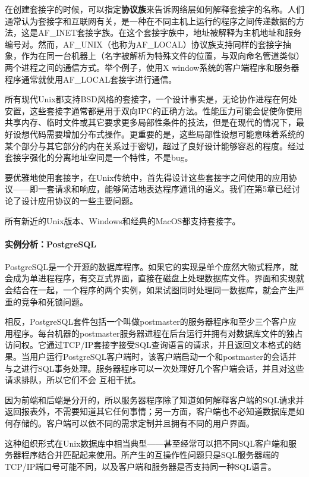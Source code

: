 \documentclass[12pt,oneside]{book}
\begin{document}
\begin{common-format}
在创建套接字的时候，可以指定\textbf{协议族}来告诉网络层如何解释套接字的名称。人们通常认为套接字和互联网有关，是一种在不同主机上运行的程序之间传递数据的方法，这是AF\_{}INET套接字族。在这个套接字族中，地址被解释为主机地址和服务编号对。然而，AF\_{}UNIX（也称为AF\_{}LOCAL）协议族支持同样的套接字抽象，作为在同一台机器上（名字被解析为特殊文件的位置，与双向命名管道类似）两个进程之间的通信方式。举个例子，使用X window系统的客户端程序和服务器程序通常就使用AF\_{}LOCAL套接字进行通信。

所有现代Unix都支持BSD风格的套接字，一个设计事实是，无论协作进程在何处安置，这些套接字通常都是用于双向IPC的正确方法。性能压力可能会促使你使用共享内存、临时文件或其它要求更多局部性条件的技法，但是在现代的情况下，最好设想代码需要增加分布式操作。更重要的是，这些局部性设想可能意味着系统的某个部分与其它部分的内在关系过于密切，超过了良好设计能够容忍的程度。经过套接字强化的分离地址空间是一个特性，不是bug。

要优雅地使用套接字，在Unix传统中，首先得设计这些套接字之间使用的应用协议——即一套请求和响应，能够简洁地表达程序通讯的语义。我们在第5章已经讨论了设计应用协议的一些主要问题。

所有新近的Unix版本、Windows和经典的MacOS都支持套接字。


\paragraph{实例分析：PostgreSQL}
PostgreSQL是一个开源的数据库程序。如果它的实现是单个庞然大物式程序，就会成为单进程程序，有交互式界面，直接在磁盘上处理数据库文件。界面和实现就会结合在一起，一个程序的两个实例，如果试图同时处理同一数据库，就会产生严重的竞争和死锁问题。

相反，PostgreSQL套件包括一个叫做postmaster的服务器程序和至少三个客户应用程序。每台机器的postmaster服务器进程在后台运行并拥有对数据库文件的独占访问权。它通过TCP/IP套接字接受SQL查询语言的请求，并且返回文本格式的结果。当用户运行PostgreSQL客户端时，该客户端启动一个和postmaster的会话并与之进行SQL事务处理。服务器程序可以一次处理好几个客户端会话，并且对这些请求排队，所以它们不会
互相干扰。

因为前端和后端是分开的，所以服务器程序除了知道如何解释客户端的SQL请求并返回报表外，不需要知道其它任何事情；另一方面，客户端也不必知道数据库是如何存储的。客户端可以依不同的需求定制并且拥有不同的用户界面。

这种组织形式在Unix数据库中相当典型——甚至经常可以把不同SQL客户端和服务器程序结合并匹配起来使用。所产生的互操作性问题只是SQL服务器端的TCP/IP端口号可能不同，以及客户端和服务器是否支持同一种SQL语言。



\end{common-format}
\end{document}
